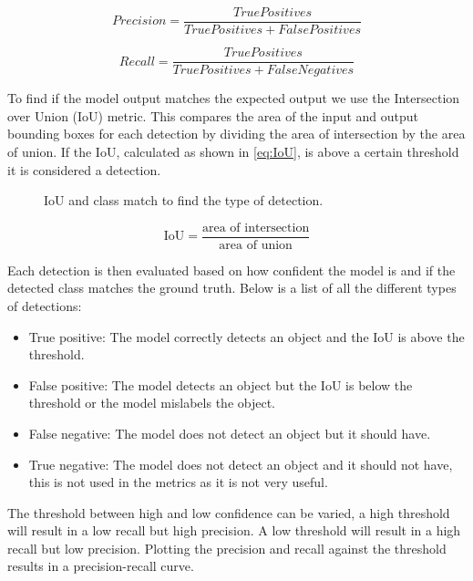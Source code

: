 \begin{equation}
	Precision = \frac{TruePositives}{True Positives + False Positives}
	\label{eq:precision}
\end{equation}

\begin{equation}
	Recall = \frac{True Positives}{True Positives + False Negatives}
	\label{eq:recall}
\end{equation}

To find if the model output matches the expected output we use the Intersection over Union (IoU) metric. This compares the area of the input and output bounding boxes for each detection by dividing the area of intersection by the area of union. If the IoU, calculated as shown in \ref{eq:IoU}, is above a certain threshold it is considered a detection.

\begin{figure}[h]
	\centering
	
	\caption{\label{fig:2_IoU_det} IoU and class match to find the type of detection.}
\end{figure}

\begin{equation}
	\text{IoU} = \frac{\text{area of intersection}}{\text{area of union}}
	\label{eq:IoU}
\end{equation}

Each detection is then evaluated based on how confident the model is and if the detected class matches the ground truth. Below is a list of all the different types of detections:

\begin{itemize}
	\item True positive: The model correctly detects an object and the IoU is above the threshold.
	\item False positive: The model detects an object but the IoU is below the threshold or the model mislabels the object.
	\item False negative: The model does not detect an object but it should have.
	\item True negative: The model does not detect an object and it should not have, this is not used in the metrics as it is not very useful.
\end{itemize}

The threshold between high and low confidence can be varied, a high threshold will result in a low recall but high precision. A low threshold will result in a high recall but low precision. Plotting the precision and recall against the threshold results in a precision-recall curve.

